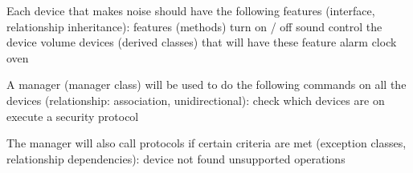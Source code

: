 Each device that makes noise should have the following features (interface, relationship inheritance):\+ features (methods) turn on /\+ off sound control the device volume devices (derived classes) that will have these feature alarm clock oven

A manager (manager class) will be used to do the following commands on all the devices (relationship:\+ association, unidirectional):\+ check which devices are on execute a security protocol

The manager will also call protocols if certain criteria are met (exception classes, relationship dependencies):\+ device not found unsupported operations 